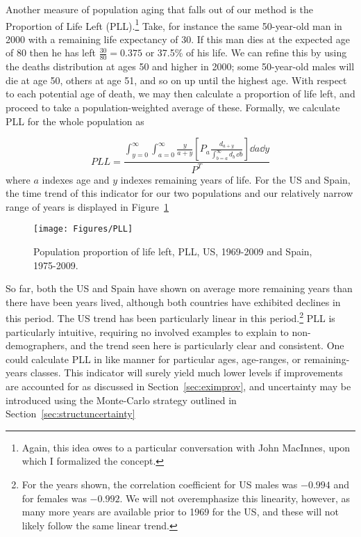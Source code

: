 Another measure of population aging that falls out of our method is the
Proportion of Life Left (PLL).\footnote{Again, this idea owes to a
particular conversation with John MacInnes, upon which I formalized the
concept.} Take, for instance the same 50-year-old man in 2000 with a remaining life expectancy of
30. If this man dies at the expected age of 80 then he has left $\tfrac{30}{80}
= 0.375$ or 37.5\% of his life. We can refine this by using the deaths 
distribution at ages 50 and higher in 2000; some 50-year-old
males will die at age 50, others at age 51, and so on up until the highest age.
With respect to each potential age of death, we may then calculate a proportion
of life left, and proceed to take a population-weighted average of these.
Formally, we calculate PLL for the whole population as

\begin{equation}
PLL = \frac{\int _{y = 0} ^\infty \int _{a = 0} ^\infty \frac{y}{a + y}
\left[ P_a
\frac{d_{a + y} }{ \int _{b = a} ^{\infty} d_b\, \dd b  }\right] \dd a \dd y }{
P^T }
\end{equation}
where $a$ indexes age and $y$ indexes remaining years of life. For the US and
Spain, the time trend of this indicator for our two populations and our
relatively narrow range of years is displayed in Figure~\ref{fig:PLL}
\begin{figure}
      \centering
      \caption{Population proportion of life left, PLL, US, 1969-2009 and
      Spain, 1975-2009.}
         \texttt{[image: Figures/PLL]}
      \label{fig:PLL} 
\end{figure}

So far, both the US and Spain have shown on average more remaining years than
there have been years lived, although both countries have exhibited declines in
this period. The US trend has been particularly linear in this
period.\footnote{For the years shown, the correlation coefficient for US males
was $-0.994$ and for females was $-0.992$. We will not overemphasize this
linearity, however, as many more years are available prior to 1969 for the US,
and these will not likely follow the same linear trend.} PLL is particularly
intuitive, requiring no involved examples to explain to non-demographers, 
and the trend seen here is particularly clear and consistent. One could 
calculate PLL in like manner for particular ages, age-ranges, or remaining-years 
classes. This indicator will surely yield much lower levels if improvements
 are accounted for as discussed in Section~\ref{sec:eximprov}, and uncertainty 
 may be introduced using the Monte-Carlo strategy outlined in Section~\ref{sec:structuncertainty}

